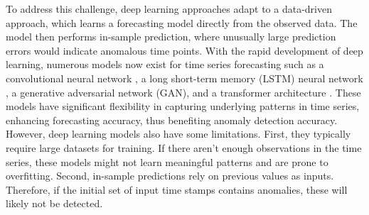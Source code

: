 \documentclass[11pt]{article}
\begin{document}
To address this challenge, deep learning approaches adapt to a data-driven approach, which learns a forecasting model directly from the observed data. The model then performs in-sample prediction, where unusually large prediction errors would indicate anomalous time points. With the rapid development of deep learning, numerous models now exist for time series forecasting such as a convolutional neural network \citep{munir2018deepant}, a long short-term memory (LSTM) neural network \citep{malhotra2015long, malhotra2016lstm}, a generative adversarial network (GAN)\citep{geiger2020tadgan}, and a transformer architecture \citep{xu2021anomaly, nie2022time}. These models have significant flexibility in capturing underlying patterns in time series, enhancing forecasting accuracy, thus benefiting anomaly detection accuracy. However, deep learning models also have some limitations. First, they typically require large datasets for training. If there aren't enough observations in the time series, these models might not learn meaningful patterns and are prone to overfitting. Second, in-sample predictions rely on previous values as inputs. Therefore, if the initial set of input time stamps contains anomalies, these will likely not be detected.






\end{document}
